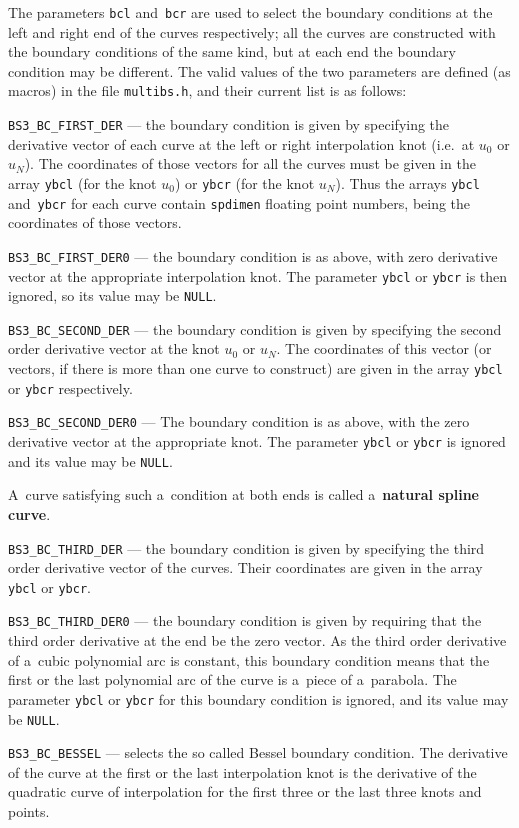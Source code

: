 The parameters \texttt{bcl} and~\texttt{bcr} are used to select the
boundary conditions at the left and right end of the curves respectively;
all the curves are constructed with the boundary conditions of the same kind,
but at each end the boundary condition may be different. The valid values
of the two parameters are defined (as macros) in the file \texttt{multibs.h},
and their current list is as follows:
\begin{mydescription}
  \item[]\texttt{BS3\_BC\_FIRST\_DER} --- the boundary condition is given
    by specifying the derivative vector of each curve at the left or right
    interpolation knot (i.e.\ at $u_0$ or $u_N$).
    The coordinates of those vectors for all the curves must be given
    in the array \texttt{ybcl} (for the knot $u_0$) or \texttt{ybcr}
    (for the knot $u_N$). Thus the arrays \texttt{ybcl}
    and~\texttt{ybcr} for each curve contain \texttt{spdimen}
    floating point numbers, being the coordinates of those vectors.
  \item[]\texttt{BS3\_BC\_FIRST\_DER0} --- the boundary condition is as above,
    with zero derivative vector at the appropriate interpolation knot.
    The parameter \texttt{ybcl} or \texttt{ybcr} is then ignored, so
    its value may be \texttt{NULL}.
  \item[]\texttt{BS3\_BC\_SECOND\_DER} --- the boundary condition is given
    by specifying the second order derivative vector at the knot
    $u_0$ or $u_N$. The coordinates of this vector (or vectors, if there
    is more than one curve to construct) are given in the array
    \texttt{ybcl} or \texttt{ybcr} respectively.
  \item[]\texttt{BS3\_BC\_SECOND\_DER0} --- The boundary condition is as above,
    with the zero derivative vector at the appropriate knot.
    The parameter \texttt{ybcl} or \texttt{ybcr} is ignored and
    its value may be \texttt{NULL}.

    A~curve satisfying such a~condition at both ends is called
    a~\textbf{natural spline curve}.
  \item[]\texttt{BS3\_BC\_THIRD\_DER} --- the boundary condition is given by
    specifying the third order derivative vector of the curves.
    Their coordinates are given in the array \texttt{ybcl} or \texttt{ybcr}.
  \item[]\texttt{BS3\_BC\_THIRD\_DER0} --- the boundary condition is given
    by requiring that the third order derivative at the end be the
    zero vector. As the third order derivative of a~cubic polynomial arc
    is constant, this boundary condition means that the first or the last
    polynomial arc of the curve is a~piece of a~parabola.
    The parameter \texttt{ybcl} or \texttt{ybcr} for this boundary condition is
    ignored, and its value may be \texttt{NULL}.
  \item[]\texttt{BS3\_BC\_BESSEL} --- selects the so called Bessel boundary
    condition. The derivative of the curve at the first or the last
    interpolation knot is the derivative of the quadratic curve of interpolation
    for the first three or the last three knots and points.


\end{mydescription}
